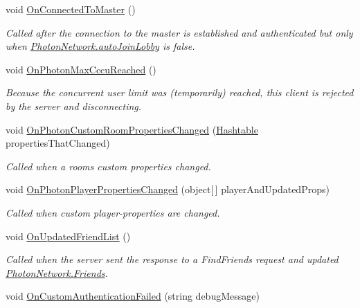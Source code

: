 \begin{DoxyCompactItemize}
void \hyperlink{interface_i_pun_callbacks_aee4c7c26520ae45019b605b054fa1ac0}{On\+Connected\+To\+Master} ()
\begin{DoxyCompactList}\small\item\em Called after the connection to the master is established and authenticated but only when \hyperlink{class_photon_network_ad534d4da7222bd8a6d8423cbd238d7f4}{Photon\+Network.\+auto\+Join\+Lobby} is false. \end{DoxyCompactList}\item 
void \hyperlink{interface_i_pun_callbacks_a445d24c62e4e3d8bbc2cc0d25853d43c}{On\+Photon\+Max\+Cccu\+Reached} ()
\begin{DoxyCompactList}\small\item\em Because the concurrent user limit was (temporarily) reached, this client is rejected by the server and disconnecting. \end{DoxyCompactList}\item 
void \hyperlink{interface_i_pun_callbacks_a3a210383eb25f1c6f509aaa23c792f6f}{On\+Photon\+Custom\+Room\+Properties\+Changed} (\hyperlink{_extensions_8cs_afa613ef589c02dbd94acc273b62cdcfd}{Hashtable} properties\+That\+Changed)
\begin{DoxyCompactList}\small\item\em Called when a room\textquotesingle{}s custom properties changed. \end{DoxyCompactList}\item 
void \hyperlink{interface_i_pun_callbacks_aa6d84e9c68f93825fb3bf453d6f5ca1b}{On\+Photon\+Player\+Properties\+Changed} (object\mbox{[}$\,$\mbox{]} player\+And\+Updated\+Props)
\begin{DoxyCompactList}\small\item\em Called when custom player-\/properties are changed. \end{DoxyCompactList}\item 
void \hyperlink{interface_i_pun_callbacks_a5dd5d351e76698a0b6665064f6282baa}{On\+Updated\+Friend\+List} ()
\begin{DoxyCompactList}\small\item\em Called when the server sent the response to a Find\+Friends request and updated \hyperlink{class_photon_network_afd22fd553d52fdc63e975c32ea47514f}{Photon\+Network.\+Friends}. \end{DoxyCompactList}\item 
void \hyperlink{interface_i_pun_callbacks_a9b55ef4a99252e1a9a111a3f88b61e1d}{On\+Custom\+Authentication\+Failed} (string debug\+Message)

\end{DoxyCompactItemize}
